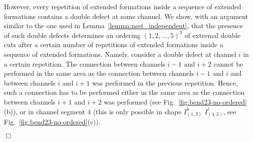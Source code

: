 \documentclass[a4paper,10pt]{llncs}
\renewenvironment{proof}
{{\bf Proof:}}{\hspace*{\fill}$\Box$\par\vspace{2mm}}
\begin{document}
\begin{proof}
However, every repetition of extended formations inside a sequence of extended formations contains a double defect at some channel. We show, with an argument similar to the one used in Lemma~\ref{lemma:nest_independent}, that the presence of such double defects determines an ordering $(1,2,\ldots ,5)^3$ of extremal double cuts after a certain number of repetitions of extended formations inside a sequence of extended formations. Namely, consider a double defect at channel $i$ in a certain repetition. The connection between channels $i-1$ and $i+2$ cannot be performed in the same area as the connection between channels $i-1$ and $i$ and between channels $i$ and $i+1$ was performed in the previous repetition. Hence, such a connection has to be performed either in the same area as the connection between channels $i+1$ and $i+2$ was performed (see Fig.~\ref{fig:bend23-no-ordered}(b)), or in channel segment $4$ (this is only possible in shape $I_{(1,3)}^h$ $I_{(4,2)}^l$, see Fig.~\ref{fig:bend23-no-ordered}(c)).

\end{proof}
\end{document}
